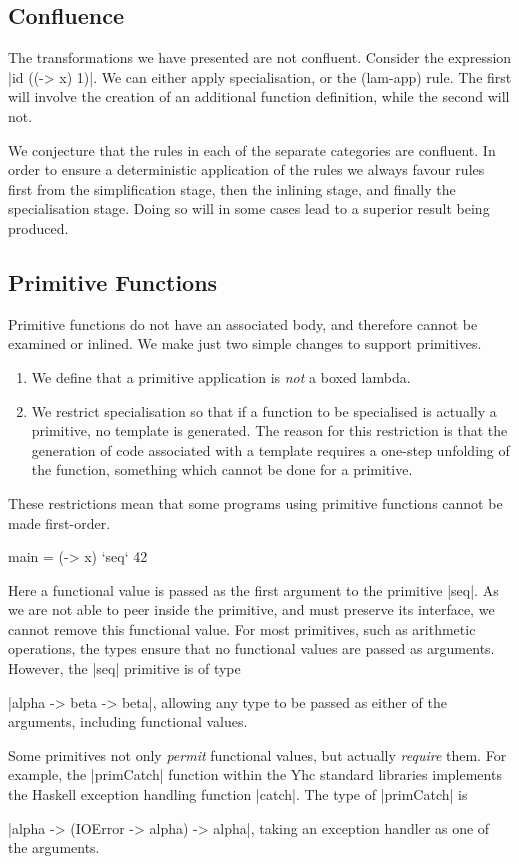 \documentclass[preprint]{sigplanconf}
\begin{document}
\subsection{Confluence}

The transformations we have presented are not confluent. Consider the expression |id ((\x -> x) 1)|. We can either apply specialisation, or the (lam-app) rule. The first will involve the creation of an additional function definition, while the second will not.

We conjecture that the rules in each of the separate categories are confluent. In order to ensure a deterministic application of the rules we always favour rules first from the simplification stage, then the inlining stage, and finally the specialisation stage. Doing so will in some cases lead to a superior result being produced.

\subsection{Primitive Functions}
\label{sec:primitives}

Primitive functions do not have an associated body, and therefore cannot be examined or inlined. We make just two simple changes to support primitives.

\begin{enumerate}
\item We define that a primitive application is \textit{not} a boxed lambda.
\item We restrict specialisation so that if a function to be specialised is actually a primitive, no template is generated. The reason for this restriction is that the generation of code associated with a template requires a one-step unfolding of the function, something which cannot be done for a primitive.
\end{enumerate}

These restrictions mean that some programs using primitive functions cannot be made first-order.

\begin{example}
\begin{code}
main = (\x -> x) `seq` 42
\end{code}

Here a functional value is passed as the first argument to the primitive |seq|. As we are not able to peer inside the primitive, and must preserve its interface, we cannot remove this functional value. For most primitives, such as arithmetic operations, the types ensure that no functional values are passed as arguments. However, the |seq| primitive is of type \ignore|alpha -> beta -> beta|, allowing any type to be passed as either of the arguments, including functional values.

Some primitives not only \textit{permit} functional values, but actually \textit{require} them. For example, the |primCatch| function within the Yhc standard libraries implements the Haskell exception handling function |catch|. The type of |primCatch| is \ignore|alpha -> (IOError -> alpha) -> alpha|, taking an exception handler as one of the arguments.
\end{example}
\end{document}
